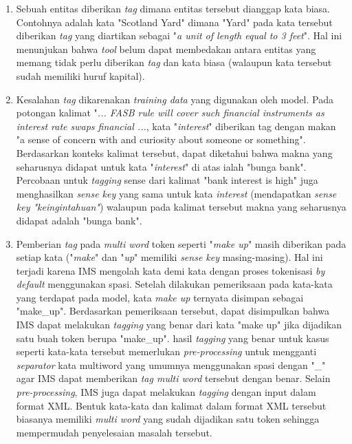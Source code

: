 \begin{enumerate}
	\item Sebuah entitas diberikan \textit{tag} dimana entitas tersebut dianggap kata biasa. Contohnya adalah kata "Scotland Yard" dimana "Yard" pada kata tersebut diberikan \textit{tag} yang diartikan sebagai "\textit{a unit of length equal to 3 feet}". Hal ini menunjukan bahwa \textit{tool} belum dapat membedakan antara entitas yang memang tidak perlu diberikan \textit{tag} dan kata biasa (walaupun kata tersebut sudah memiliki huruf kapital).
	
	
	\item Kesalahan \textit{tag} dikarenakan \textit{training data} yang digunakan oleh model. Pada potongan kalimat "\textit{... FASB rule will cover such financial instruments as interest rate swaps financial ...}, kata "\textit{interest}" diberikan tag dengan makan "a sense of concern with and curiosity about someone or something". Berdasarkan konteks kalimat tersebut, dapat diketahui bahwa makna yang seharusnya didapat untuk kata "\textit{interest}" di atas ialah "bunga bank". Percobaan untuk \textit{tagging} sense dari kalimat "bank interest is high" juga menghasilkan \textit{sense key} yang sama untuk kata \textit{interest} (mendapatkan \textit{sense key "keingintahuan"}) walaupun pada kalimat tersebut makna yang seharusnya didapat adalah "bunga bank".
		
	\item Pemberian \textit{tag} pada \textit{multi word} token seperti "\textit{make up}" masih diberikan pada setiap kata ("\textit{make}" dan "\textit{up}" memiliki \textit{sense key} masing-masing). Hal ini terjadi karena IMS mengolah kata demi kata dengan proses tokenisasi \textit{by default} menggunakan spasi. Setelah dilakukan pemeriksaan pada kata-kata yang terdapat pada model, kata \textit{make up} ternyata disimpan sebagai "make\_up". Berdasarkan pemeriksaan tersebut, dapat disimpulkan bahwa IMS dapat melakukan \textit{tagging} yang benar dari kata "make up" jika dijadikan satu buah token berupa "make\_up". hasil \textit{tagging} yang benar untuk kasus seperti kata-kata tersebut memerlukan \textit{pre-processing} untuk mengganti \textit{separator} kata multiword yang umumnya menggunakan spasi dengan "\_" agar IMS dapat memberikan \textit{tag multi word} tersebut dengan benar. Selain \textit{pre-processing},  IMS juga dapat melakukan \textit{tagging} dengan input dalam format XML. Bentuk kata-kata dan kalimat dalam format XML tersebut biasanya memiliki \textit{multi word} yang sudah dijadikan satu token sehingga mempermudah penyelesaian masalah tersebut.
\end{enumerate}

